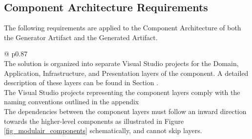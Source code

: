 \subsection{Component Architecture Requirements} \label{component_requirements}
 
The following requirements are applied to the Component Architecture of both the Generator
Artifact and the Generated Artifact.

\begin{table}[H]
    \begin{tabular}{@{\makebox[2em][c]{\rownumber\space}}  p{0.87\linewidth}}
        \\ 
    \hline
    The solution is organized into separate Visual Studio projects for the Domain,
    Application, Infrastructure, and Presentation layers of the component. A detailed
    description of these layers can be found in Section .
    \\
    The Visual Studio projects representing the component layers comply with the naming
    conventions outlined in the appendix  \\
       
    The dependencies between the component layers must follow an inward direction towards
    the higher-level components as illustrated in Figure \ref{fig_modulair_components}
    schematically, and cannot skip layers. \\
       \hline
    \end{tabular}
\caption{The Component Architecture Requirements}
\label{table_component_requirements}
\end{table}


